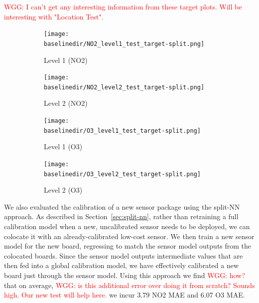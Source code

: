 \documentclass[journal abbreviation, manuscript]{copernicus}
\newcommand\todo[1]{\textcolor{red}{#1}}
\begin{document}
\begin{figure}[H]
\label{fig:split-comparison}
\end{figure}

\todo{WGG: I can't get any interesting information from these target plots.  Will be interesting with "Location Test".}

\begin{figure}[H]
\centering
\begin{subfigure}{0.45\textwidth}
\texttt{[image: \\baselinedir/NO2\_level1\_test\_target-split.png]}
\caption{Level 1 (NO2)}
\end{subfigure}
\begin{subfigure}{0.45\textwidth}
\texttt{[image: \\baselinedir/NO2\_level2\_test\_target-split.png]}
\caption{Level 2 (NO2)}
\end{subfigure}
\begin{subfigure}{0.45\textwidth}
\texttt{[image: \\baselinedir/O3\_level1\_test\_target-split.png]}
\caption{Level 1 (O3)}
\end{subfigure}
\begin{subfigure}{0.45\textwidth}
\texttt{[image: \\baselinedir/O3\_level2\_test\_target-split.png]}
\caption{Level 2 (O3)}
\end{subfigure}
\caption{}
\label{fig:target-plots-levels-split}
\end{figure}

We also evaluated the calibration of a new sensor package using the split-NN approach. As described in Section~\ref{sec:split-nn}, rather than retraining a full calibration model when a new, uncalibrated sensor needs to be deployed, we can colocate it with an already-calibrated low-cost sensor. We then train a new sensor model for the new board, regressing to match the sensor model outputs from the colocated boards. Since the sensor model outputs intermediate values that are then fed into a global calibration model, we have effectively calibrated a new board just through the sensor model. Using this approach we find \todo{WGG: how?} that on average, \todo{WGG: is this additional error over doing it from scratch?  Sounds high.  Our new test will help here.} we incur 3.79 NO2 MAE and 6.07 O3 MAE.



\end{document}
